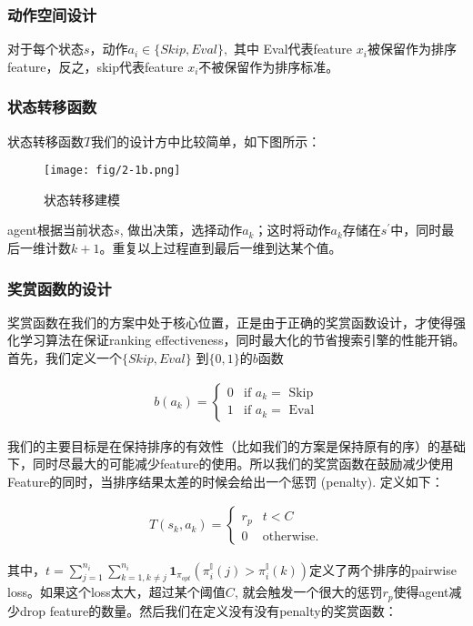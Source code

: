 \subsubsection{动作空间设计}
对于每个状态$s$，动作$a_i \in \{Skip, Eval\},$ 其中 Eval代表feature $x_i$被保留作为排序feature，反之，skip代表feature $x_i$不被保留作为排序标准。

\subsubsection{状态转移函数}
状态转移函数$T$我们的设计方中比较简单，如下图所示：
\begin{figure}[!h]
\centering
\texttt{[image: fig/2-1b.png]}
\caption{状态转移建模}
\end{figure}

agent根据当前状态$s$, 做出决策，选择动作$a_k$；这时将动作$a_k$存储在$s^\prime$中，同时最后一维计数$k+1$。重复以上过程直到最后一维到达某个值。

\subsubsection{奖赏函数的设计}
奖赏函数在我们的方案中处于核心位置，正是由于正确的奖赏函数设计，才使得强化学习算法在保证ranking effectiveness，同时最大化的节省搜索引擎的性能开销。
首先，我们定义一个$\{Skip, Eval\}$ 到$\{0,1\}$的$b$函数

\begin{align}
b(a_k) = \begin{cases}
    0 &\text{if $a_k=$ Skip}\\
    1 &\text{if $a_k=$ Eval}
\end{cases}
\end{align}

我们的主要目标是在保持排序的有效性（比如我们的方案是保持原有的序）的基础下，同时尽最大的可能减少feature的使用。所以我们的奖赏函数在鼓励减少使用Feature的同时，当排序结果太差的时候会给出一个惩罚 (penalty). 定义如下：

\begin{align}
T(s_k,a_k) = \begin{cases}
r_{p} & t<C \\
0 &\text{otherwise.}
\end{cases}
\end{align}


其中，$t=\sum_{j=1}^{n_i}\sum_{k=1, k \neq j}^{n_i} \mathbf{1}_{\pi_{opt}}(\pi_i^{\mathbb{I}}(j)>\pi_{i}^{\mathbb{I}}(k))$定义了两个排序的pairwise loss。如果这个loss太大，超过某个阈值$C$, 就会触发一个很大的惩罚$r_{p}$使得agent减少drop feature的数量。然后我们在定义没有没有penalty的奖赏函数：

